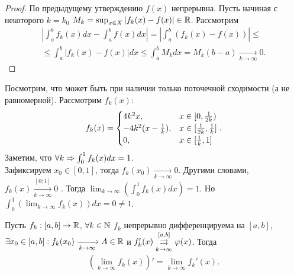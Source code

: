\documentclass[../main.tex]{subfiles}
\begin{document}
 
 \begin{proof}
   По предыдущему утверждению $ f(x)$ непрерывна. Пусть начиная с некоторого $ k = k_0$ $ M_k = \sup_{x\in X} \left| f_k(x)  - f(x)  \right| \in \R$. Рассмотрим 
   \begin{multline} 
     \left| \int_{a}^{b} f_k(x) dx - \int_{a}^{b} f(x) dx \right|  = \left| \int_{a}^{b} \left( f_k(x) - f(x) \right) \right| \leq \\ \leq \int_{a}^{b} \left| f_k(x) - f(x)  \right| dx \leq \int_{a}^{b} M_k dx  = M_k (b-a)   \xrightarrow[k \to  \infty ]{} 0 .
   \end{multline}
 \end{proof}

 \begin{example}
   Посмотрим, что может быть при наличии только поточечной сходимости (а не равномерной). Рассмотрим $ f_k(x)  $: 
   \begin{gather} 
     f_k(x) = \System{4k^{2}x, &x \in [0, \frac{1}{2k})\\ -4k^{2}(x-\frac{1}{k}), &x \in [\frac{1}{2k}, \frac{1}{k}] \\ 0, &x \in [\frac{1}{k}, 1]} .
   \end{gather} 
   Заметим, что $ \forall k \hence \int_{0}^{1} f_k(x) dx = 1$. \\
   Зафиксируем $ x_0 \in [0, 1]$, тогда $ f_k (x_0 )  \xrightarrow[k \to  \infty ]{} 0 $. Другими словами, $ f_k(x)  \xrightarrow[k \to  \infty ]{[0;1]} 0 $ . Тогда $ \lim_{k \to \infty} \left(\int_{0}^{1} f_k(x) dx\right) = 1$. Но $ \int_{0}^{1} \left(\lim_{k \to \infty} f_k(x) \right)dx = 0 \neq 1$.    
 \end{example}

 
 
 \begin{proposition} \label{prop:funcseq:changeder}
   Пусть $ f_k : [a,b] \to \R$, $ \forall k \in \N$ $ f_k $ непрерывно дифференцируема на $ [a, b]$, $ \exists x_0 \in [a,b] : f_k (x_0 )  \xrightarrow[k \to  \infty ]{} A \in \R$ и $ f'_k (x) \convergesuniformly{k \to \infty}{[a,b]} \phi(x)$. Тогда 
   \begin{gather} 
     \left(\lim_{k \to \infty} f_k(x)  \right)' = \lim_{k \to \infty} f_k'(x) .
   \end{gather}    
 \end{proposition}
 
\end{document}
